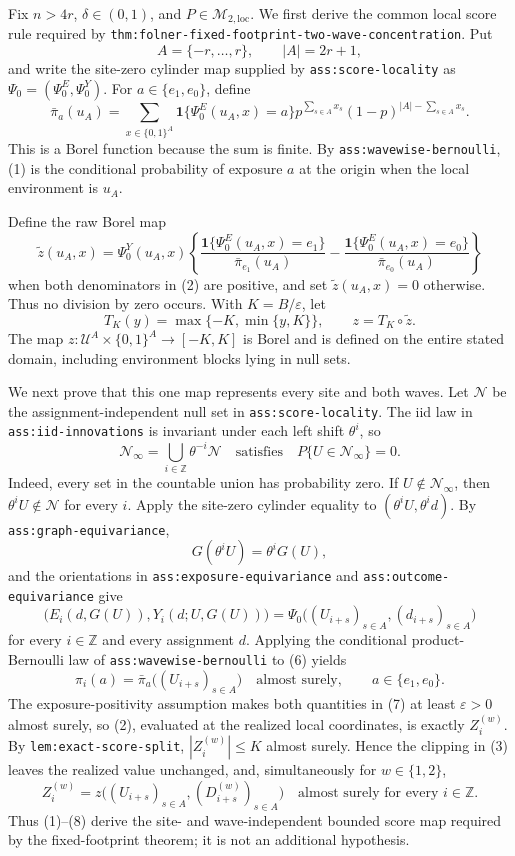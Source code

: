 Fix \(n>4r\), \(\delta\in(0,1)\), and \(P\in\mathcal M_{2,\mathrm{loc}}\).  We first derive the common local score rule required by \texttt{thm:folner-fixed-footprint-two-wave-concentration}.  Put
\[
 A=\{-r,\ldots,r\},
 \qquad |A|=2r+1,
\]
and write the site-zero cylinder map supplied by \texttt{ass:score-locality} as \(\Psi_0=(\Psi_0^E,\Psi_0^Y)\).  For \(a\in\{e_1,e_0\}\), define
\[
 \bar\pi_a(u_A)
 =\sum_{x\in\{0,1\}^{A}}
   \mathbf 1\{\Psi_0^E(u_A,x)=a\}
   p^{\sum_{s\in A}x_s}(1-p)^{|A|-\sum_{s\in A}x_s}. \tag{1}
\]
This is a Borel function because the sum is finite.  By \texttt{ass:wavewise-bernoulli}, (1) is the conditional probability of exposure \(a\) at the origin when the local environment is \(u_A\).

Define the raw Borel map
\[
 \widetilde z(u_A,x)=
 \Psi_0^Y(u_A,x)
 \left\{
  \frac{\mathbf 1\{\Psi_0^E(u_A,x)=e_1\}}{\bar\pi_{e_1}(u_A)}
  -\frac{\mathbf 1\{\Psi_0^E(u_A,x)=e_0\}}{\bar\pi_{e_0}(u_A)}
 \right\} \tag{2}
\]
when both denominators in (2) are positive, and set \(\widetilde z(u_A,x)=0\) otherwise.  Thus no division by zero occurs.  With \(K=B/\varepsilon\), let
\[
 T_K(y)=\max\{-K,\min\{y,K\}\},
 \qquad z=T_K\circ\widetilde z. \tag{3}
\]
The map \(z:\mathcal U^A\times\{0,1\}^A\to[-K,K]\) is Borel and is defined on the entire stated domain, including environment blocks lying in null sets.

We next prove that this one map represents every site and both waves.  Let \(\mathcal N\) be the assignment-independent null set in \texttt{ass:score-locality}.  The iid law in \texttt{ass:iid-innovations} is invariant under each left shift \(\theta^i\), so
\[
 \mathcal N_\infty=\bigcup_{i\in\mathbb Z}\theta^{-i}\mathcal N
 \quad\text{satisfies}\quad
 P\{U\in\mathcal N_\infty\}=0. \tag{4}
\]
Indeed, every set in the countable union has probability zero.  If \(U\notin\mathcal N_\infty\), then \(\theta^iU\notin\mathcal N\) for every \(i\).  Apply the site-zero cylinder equality to \((\theta^iU,\theta^id)\).  By \texttt{ass:graph-equivariance},
\[
 G(\theta^iU)=\theta^iG(U), \tag{5}
\]
and the orientations in \texttt{ass:exposure-equivariance} and \texttt{ass:outcome-equivariance} give
\[
 \bigl(E_i(d,G(U)),Y_i(d;U,G(U))\bigr)
 =\Psi_0\bigl((U_{i+s})_{s\in A},(d_{i+s})_{s\in A}\bigr) \tag{6}
\]
for every \(i\in\mathbb Z\) and every assignment \(d\).  Applying the conditional product-Bernoulli law of \texttt{ass:wavewise-bernoulli} to (6) yields
\[
 \pi_i(a)=\bar\pi_a\bigl((U_{i+s})_{s\in A}\bigr)
 \quad\text{almost surely},
 \qquad a\in\{e_1,e_0\}. \tag{7}
\]
The exposure-positivity assumption makes both quantities in (7) at least \(\varepsilon>0\) almost surely, so (2), evaluated at the realized local coordinates, is exactly \(Z_i^{(w)}\).  By \texttt{lem:exact-score-split}, \(|Z_i^{(w)}|\le K\) almost surely.  Hence the clipping in (3) leaves the realized value unchanged, and, simultaneously for \(w\in\{1,2\}\),
\[
 Z_i^{(w)}
 =z\bigl((U_{i+s})_{s\in A},(D_{i+s}^{(w)})_{s\in A}\bigr)
 \quad\text{almost surely for every }i\in\mathbb Z. \tag{8}
\]
Thus (1)--(8) derive the site- and wave-independent bounded score map required by the fixed-footprint theorem; it is not an additional hypothesis.

